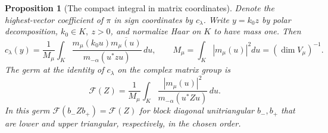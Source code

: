 \documentclass[a4paper,11pt]{article}
\newtheorem{proposition}{Proposition}[section]
\theoremstyle{definition}
\theoremstyle{remark}
\numberwithin{equation}{section}
\begin{document}
\begin{proposition}[The compact integral in matrix coordinates]\leavevmode
\label{prop:polarcoefficient697}
Denote the highest-vector coefficient of \(\pi\) in sign
coordinates by \(c_\lambda\). Write \(y=k_0z\) by polar
decomposition, \(k_0\in K,\ z>0\), and normalize Haar on
\(K\) to have mass one. Then
\[
  c_\lambda(y)=\frac{1}{M_\mu}
       \int_K\frac{m_\mu(k_0u)\overline{m_\mu(u)}}
                     {m_{-\alpha}(u^*zu)}\,du,\qquad
  M_\mu=\int_K |m_\mu(u)|^2du
       =(\dim V_\mu)^{-1}.
\]
The germ at the identity of \(c_\lambda\) on the complex
matrix group is
\[
           \mathcal F(Z)=\frac{1}{M_\mu}
             \int_K\frac{|m_\mu(u)|^2}
                           {m_{-\alpha}(u^*Zu)}\,du .
\]
In this germ \(\mathcal F(b_- Z b_+)=\mathcal F(Z)\) for
block diagonal unitriangular \(b_-,b_+\) that are lower and
upper triangular, respectively, in the chosen order.
\end{proposition}
\end{document}
